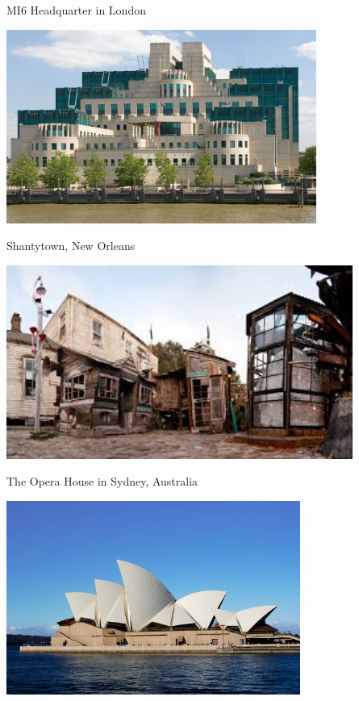 \begin{frame}[fragile]{MI6 Headquarter in London}
\begin{center}
  \includegraphics[height=180pt]{mi6.jpg}
\end{center}
\end{frame}

\begin{frame}[fragile]{Shantytown, New Orleans}
\begin{center}
  \includegraphics[height=180pt]{badbuilding3.jpg}
\end{center}
\end{frame}

\begin{frame}[fragile]{The Opera House in Sydney, Australia}
\begin{center}
  \includegraphics[height=180pt]{SydneyOpera.jpg}
\end{center}
\end{frame}

